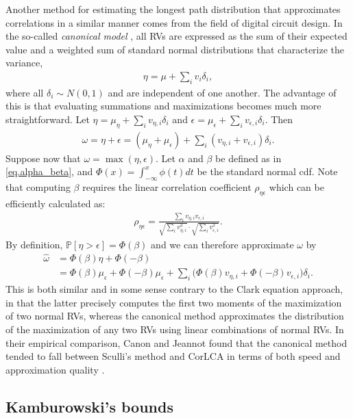 \documentclass[12pt]{article}
\def\P{\mathbb{P}}
\begin{document}
Another method for estimating the longest path distribution that approximates correlations in a similar manner comes from the field of digital circuit design. In the so-called {\em canonical model} \cite{vis06,zha06}, all RVs are expressed as the sum of their expected value and a weighted sum of standard normal distributions that characterize the variance, 
\begin{align*}
\eta = \mu + \sum_i v_i \delta_i,
\end{align*}  
where all $\delta_i \sim N(0, 1)$ and are independent of one another. The advantage of this is that evaluating summations and maximizations becomes much more straightforward. Let $\eta = \mu_\eta + \sum_i v_{\eta, i} \delta_i$ and $\epsilon = \mu_\epsilon + \sum_i v_{\epsilon, i} \delta_i$. Then 
\begin{align*}
\omega = \eta + \epsilon = (\mu_\eta + \mu_\epsilon) + \sum_i (v_{\eta, i} + v_{\epsilon, i}) \delta_i.
\end{align*}
Suppose now that $\omega = \max(\eta, \epsilon)$. Let $\alpha$ and $\beta$ be defined as in \eqref{eq.alpha_beta}, and $\Phi(x) = \int_{-\infty}^{x} \phi(t) dt$ be the standard normal cdf. Note that computing $\beta$ requires the linear correlation coefficient $\rho_{\eta\epsilon}$ which can be efficiently calculated as:
\begin{align*}
\rho_{\eta\epsilon} = \frac{\sum_i v_{\eta, i} v_{\epsilon, i}}{\sqrt{\sum_i v_{\eta, i}^2} \cdot \sqrt{\sum_i v_{\epsilon, i}^2} }.
\end{align*}
By definition, $\P[\eta > \epsilon] = \Phi(\beta)$ and we can therefore approximate $\omega$ by 
\begin{align*}
\hat{\omega} &= \Phi(\beta)\eta + \Phi(-\beta) \\
&= \Phi(\beta) \mu_\epsilon + \Phi(-\beta) \mu_\epsilon + \sum_i \big( \Phi(\beta) v_{\eta, i} + \Phi(-\beta) v_{\epsilon, i} \big) \delta_i.
\end{align*}
This is both similar and in some sense contrary to the Clark equation approach, in that the latter precisely computes the first two moments of the maximization of two normal RVs, whereas the canonical method approximates the distribution of the maximization of any two RVs using linear combinations of normal RVs. In their empirical comparison, Canon and Jeannot found that the canonical method tended to fall between Sculli's method and CorLCA in terms of both speed and approximation quality \cite{can16}. 


\subsection{Kamburowski's bounds}
\label{subsect.kamburowski}
\end{document}
